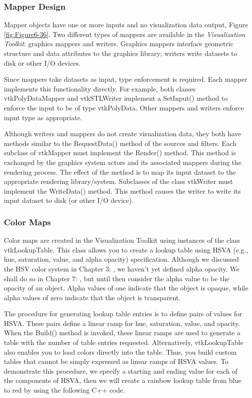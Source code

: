 \subsubsection{Mapper Design}
\label{subsubsec:mapper_design}
Mapper objects have one or more inputs and no visualization data output, Figure \ref{fig:Figure6-36}. Two different types of mappers are available in the \emph{Visualization Toolkit}: graphics mappers and writers. Graphics mappers interface geometric structure and data attributes to the graphics library; writers write datasets to disk or other I/O devices.

Since mappers take datasets as input, type enforcement is required. Each mapper implements this functionality directly. For example, both classes vtkPolyDataMapper and vtkSTLWriter implement a SetInput() method to enforce the input to be of type vtkPolyData. Other mappers and writers enforce input type as appropriate.

Although writers and mappers do not create visualization data, they both have methods similar to the RequestData() method of the sources and filters. Each subclass of vtkMapper must implement the Render() method. This method is exchanged by the graphics system actors and its associated mappers during the rendering process. The effect of the method is to map its input dataset to the appropriate rendering library/system. Subclasses of the class vtkWriter must implement the WriteData() method. This method causes the writer to write its input dataset to disk (or other I/O device).

\subsubsection{Color Maps}

Color maps are created in the Visualization Toolkit using instances of the class vtkLookupTable. This class allows you to create a lookup table using HSVA (e.g., hue, saturation, value, and alpha opacity) specification. Although we discussed the HSV color system in Chapter 3: , we haven't yet defined alpha opacity. We shall do so in Chapter 7:  , but until then consider the alpha value to be the opacity of an object. Alpha values of one indicate that the object is opaque, while alpha values of zero indicate that the object is transparent.

The procedure for generating lookup table entries is to define pairs of values for HSVA. These pairs define a linear ramp for hue, saturation, value, and opacity. When the Build() method is invoked, these linear ramps are used to generate a table with the number of table entries requested. Alternatively, vtkLookupTable also enables you to load colors directly into the table. Thus, you build custom tables that cannot be simply expressed as linear ramps of HSVA values. To demonstrate this procedure, we specify a starting and ending value for each of the components of HSVA, then we will create a rainbow lookup table from blue to red by using the following C++ code.


